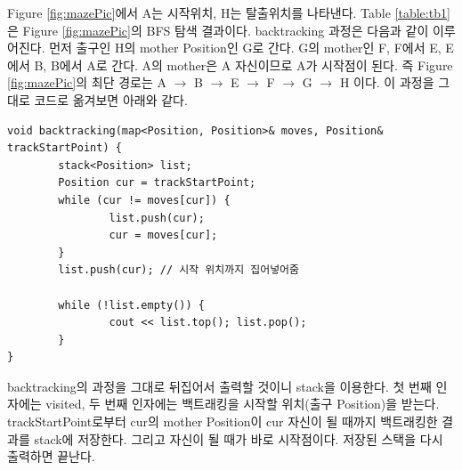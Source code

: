 \documentclass{article}
\begin{document}
\FloatBarrier
Figure \ref{fig:mazePic}에서 A는 시작위치, H는 탈출위치를 나타낸다. Table \ref{table:tb1}은 Figure \ref{fig:mazePic}의 BFS 탐색 결과이다. backtracking 과정은 다음과 같이 이루어진다. 먼저 출구인 H의 mother Position인 G로 간다. G의 mother인 F, F에서 E, E에서 B, B에서 A로 간다. A의 mother은 A 자신이므로 A가 시작점이 된다. 즉 Figure \ref{fig:mazePic}의 최단 경로는 A $\rightarrow$ B $\rightarrow$ E $\rightarrow$ F $\rightarrow$ G $\rightarrow$ H 이다. 이 과정을 그대로 코드로 옮겨보면 아래와 같다.

\begin{verbatim}
void backtracking(map<Position, Position>& moves, Position& trackStartPoint) {
    	stack<Position> list;
    	Position cur = trackStartPoint;
    	while (cur != moves[cur]) {
        		list.push(cur);
        		cur = moves[cur];
    	}
    	list.push(cur); // 시작 위치까지 집어넣어줌
    
    	while (!list.empty()) {
        		cout << list.top(); list.pop();
    	}
}
\end{verbatim}
backtracking의 과정을 그대로 뒤집어서 출력할 것이니 stack을 이용한다. 첫 번째 인자에는 visited, 두 번째 인자에는 백트래킹을 시작할 위치(출구 Position)을 받는다. trackStartPoint로부터 cur의 mother Position이 cur 자신이 될 때까지 백트래킹한 결과를 stack에 저장한다. 그리고 자신이 될 때가 바로 시작점이다. 저장된 스택을 다시 출력하면 끝난다.
\end{document}
